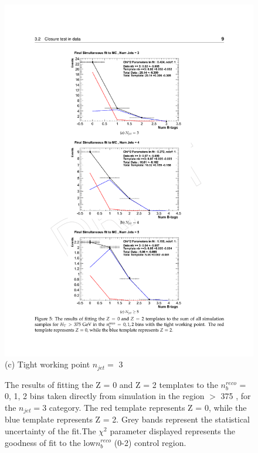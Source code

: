 \begin{figure}[ht]
\begin{minipage}[b]{0.55\linewidth}
\includegraphics[width = 1.0\linewidth]{plots/template_mc_high_njet3.pdf}
\centering (c) Tight working point $n_{jet} =$ 3 
\end{minipage}
\caption[The results of fitting the Z = 0 and Z = 2 templates to the $n_{b}^{reco}$ = 0, 1, 2 bins taken directly from simulation in the region \theht $>$ 375 \GeV, for the $n_{jet} = 3$ category.]{The results of fitting the Z = 0 and Z = 2 templates to the $n_{b}^{reco}$ = 0, 1, 2 bins taken directly from simulation in the region \theht $>$ 375 \GeV, for the $n_{jet} = 3$ category. The red template represents Z = 0, while the blue template represents Z = 2. Grey bands represent the statistical uncertainty of the fit.The $\chi^{2}$ parameter displayed represents the goodness of fit to the low$ n_{b}^{reco}$ (0-2) control region.}
\label{app:template_closure_njet3}
\end{figure}

